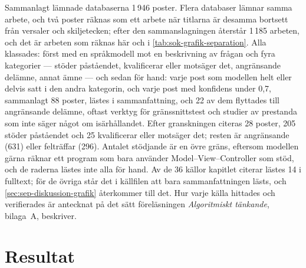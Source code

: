 Sammanlagt lämnade databaserna 1\,946 poster.  Flera databaser lämnar
samma arbete, och två poster räknas som ett arbete när titlarna är
desamma bortsett från versaler och skiljetecken; efter den
sammanslagningen återstår 1\,185 arbeten, och det är arbeten som räknas
här och i \cref{tab:sok-grafik-separation}.  Alla klassades: först med
en språkmodell mot en beskrivning av frågan och fyra kategorier ---
stöder påståendet, kvalificerar eller motsäger det, angränsande
delämne, annat ämne --- och sedan för hand: varje post som modellen
helt eller delvis satt i den andra kategorin, och varje post med
konfidens under 0,7, sammanlagt 88 poster, lästes i sammanfattning, och
22 av dem flyttades till angränsande delämne, oftast verktyg för
gränssnittstest och studier av prestanda som inte säger något om
isärhållandet.  Efter granskningen citeras 28 poster, 205 stöder
påståendet och 25 kvalificerar eller motsäger det; resten är
angränsande (631) eller felträffar (296).  Antalet stödjande är en
övre gräns, eftersom modellen gärna räknar ett program som bara
använder Model--View--Controller som stöd, och de raderna lästes inte
alla för hand.  Av de 36 källor kapitlet citerar lästes 14 i fulltext;
för de övriga står det i källfilen att bara sammanfattningen lästs, och
\cref{sec:sep-diskussion-grafik} återkommer till det.  Hur varje källa
hittades och verifierades är antecknat på det sätt föreläsningen
\emph{Algoritmiskt tänkande}, bilaga~A, beskriver.

\section{Resultat}
\label{sec:sep-resultat-grafik}

